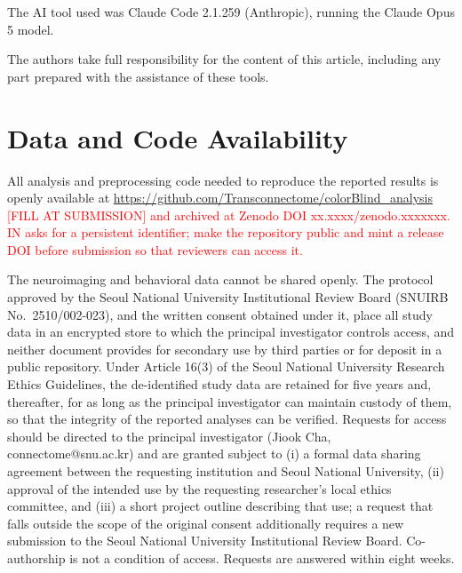\documentclass{imag-ms-template}
\newcommand{\todo}[1]{\textcolor{red}{#1}}
\begin{document}
The AI tool used was Claude Code 2.1.259 (Anthropic), running the Claude Opus 5
model.

The authors take full responsibility for the content of this article, including
any part prepared with the assistance of these tools.

\section*{Data and Code Availability}

All analysis and preprocessing code needed to reproduce the reported results is
openly available at \url{https://github.com/Transconnectome/colorBlind_analysis}
\todo{[FILL AT SUBMISSION] and archived at Zenodo DOI xx.xxxx/zenodo.xxxxxxx.
IN asks for a persistent identifier; make the repository public and mint a
release DOI before submission so that reviewers can access it.}


The neuroimaging and behavioral data cannot be shared openly. The protocol
approved by the Seoul National University Institutional Review Board (SNUIRB
No.~2510/002-023), and the written consent obtained under it, place all study
data in an encrypted store to which the principal investigator controls access,
and neither document provides for secondary use by third parties or for deposit
in a public repository. Under Article 16(3) of the Seoul National University
Research Ethics Guidelines, the de-identified study data are retained for five
years and, thereafter, for as long as the principal investigator can maintain
custody of them, so that the integrity of the reported analyses can be verified.
Requests for access should be directed to the principal investigator (Jiook Cha,
connectome@snu.ac.kr) and are granted subject to (i) a formal data sharing
agreement between the requesting institution and Seoul National University,
(ii) approval of the intended use by the requesting researcher's local ethics
committee, and (iii) a short project outline describing that use; a request that
falls outside the scope of the original consent additionally requires a new
submission to the Seoul National University Institutional Review Board.
Co-authorship is not a condition of access. Requests are answered within eight
weeks.
\end{document}

